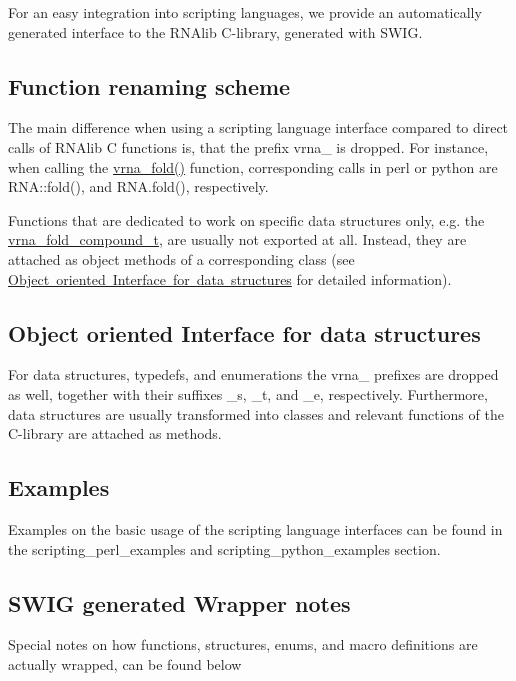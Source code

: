 For an easy integration into scripting languages, we provide an automatically generated interface to the R\+N\+Alib C-\/library, generated with S\+W\+IG.\hypertarget{wrappers_scripting_renaming}{}\subsection{Function renaming scheme}\label{wrappers_scripting_renaming}
The main difference when using a scripting language interface compared to direct calls of R\+N\+Alib C functions is, that the prefix \textquotesingle{}vrna\+\_\+\textquotesingle{} is dropped. For instance, when calling the \mbox{\hyperlink{group__mfe__fold__single_ga29a33b2895f4e67b0480271ff289afdc}{vrna\+\_\+fold()}} function, corresponding calls in perl or python are R\+N\+A\+::fold(), and R\+N\+A.\+fold(), respectively.

Functions that are dedicated to work on specific data structures only, e.\+g. the \mbox{\hyperlink{group__fold__compound_ga1b0cef17fd40466cef5968eaeeff6166}{vrna\+\_\+fold\+\_\+compound\+\_\+t}}, are usually not exported at all. Instead, they are attached as object methods of a corresponding class (see \mbox{\hyperlink{wrappers_scripting_oo_interface}{Object oriented Interface for data structures}} for detailed information).\hypertarget{wrappers_scripting_oo_interface}{}\subsection{Object oriented Interface for data structures}\label{wrappers_scripting_oo_interface}
For data structures, typedefs, and enumerations the \textquotesingle{}vrna\+\_\+\textquotesingle{} prefixes are dropped as well, together with their suffixes \textquotesingle{}\+\_\+s\textquotesingle{}, \textquotesingle{}\+\_\+t\textquotesingle{}, and \textquotesingle{}\+\_\+e\textquotesingle{}, respectively. Furthermore, data structures are usually transformed into classes and relevant functions of the C-\/library are attached as methods.\hypertarget{wrappers_scripting_examples}{}\subsection{Examples}\label{wrappers_scripting_examples}
Examples on the basic usage of the scripting language interfaces can be found in the scripting\+\_\+perl\+\_\+examples and scripting\+\_\+python\+\_\+examples section.\hypertarget{wrappers_scripting_wrapper_notes}{}\subsection{S\+W\+I\+G generated Wrapper notes}\label{wrappers_scripting_wrapper_notes}
Special notes on how functions, structures, enums, and macro definitions are actually wrapped, can be found below



